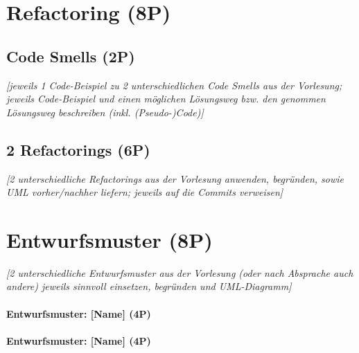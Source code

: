 \chapter{Refactoring (8P)}
\pagestyle{scrheadings}
\clearscrheadfoot
{}
\setcounter{page}{7}
\ofoot[\pagemark]{\pagemark}
\onehalfspacing

\section{Code Smells (2P)}
\emph{[jeweils 1 Code-Beispiel zu 2 unterschiedlichen Code Smells aus der Vorlesung; jeweils Code-Beispiel
und einen möglichen Lösungsweg bzw. den genommen Lösungsweg beschreiben (inkl. (Pseudo-)Code)]}

\section{2 Refactorings (6P)}
\emph{[2 unterschiedliche Refactorings aus der Vorlesung anwenden, begründen, sowie UML vorher/nachher
liefern; jeweils auf die Commits verweisen]}

\newpage
\titlespacing*{\chapter}{0pt}{-30mm}{10pt}
  
\chapter{Entwurfsmuster (8P)}
\pagestyle{scrheadings}
\clearscrheadfoot
{}
\setcounter{page}{8}
\ofoot[\pagemark]{\pagemark}
\onehalfspacing

\emph{[2 unterschiedliche Entwurfsmuster aus der Vorlesung (oder nach Absprache auch andere) jeweils
sinnvoll einsetzen, begründen und UML-Diagramm]}

\subsubsection{Entwurfsmuster: [Name] (4P)}
\subsubsection{Entwurfsmuster: [Name] (4P)}